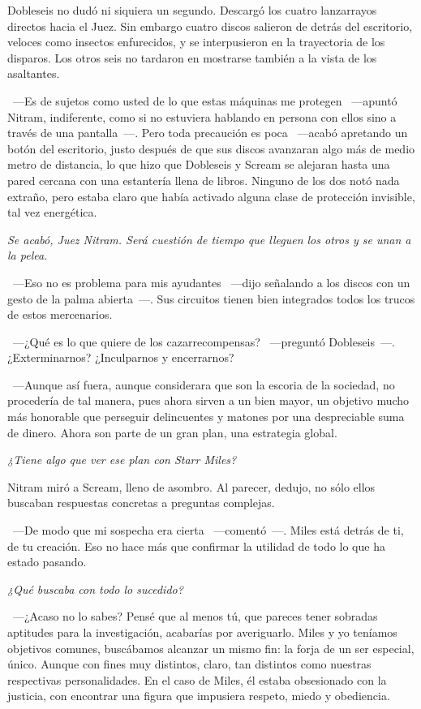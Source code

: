 Dobleseis no dudó ni siquiera un segundo. Descargó los cuatro lanzarrayos directos hacia el Juez. Sin embargo cuatro discos salieron de detrás del escritorio, veloces como insectos enfurecidos, y se interpusieron en la trayectoria de los disparos. Los otros seis no tardaron en mostrarse también a la vista de los asaltantes.

~---Es de sujetos como usted de lo que estas máquinas me protegen ~---apuntó Nitram, indiferente, como si no estuviera hablando en persona con ellos sino a través de una pantalla~---. Pero toda precaución es poca ~---acabó apretando un botón del escritorio, justo después de que sus discos avanzaran algo más de medio metro de distancia, lo que hizo que Dobleseis y Scream se alejaran hasta una pared cercana con una estantería llena de libros. Ninguno de los dos notó nada extraño, pero estaba claro que había activado alguna clase de protección invisible, tal vez energética.

\emph{Se acabó, Juez Nitram. Será cuestión de tiempo que lleguen los otros y se unan a la pelea.}

~---Eso no es problema para mis ayudantes ~---dijo señalando a los discos con un gesto de la palma abierta~---. Sus circuitos tienen bien integrados todos los trucos de estos mercenarios.

~---¿Qué es lo que quiere de los cazarrecompensas? ~---preguntó Dobleseis~---. ¿Exterminarnos? ¿Inculparnos y encerrarnos?

~---Aunque así fuera, aunque considerara que son la escoria de la sociedad, no procedería de tal manera, pues ahora sirven a un bien mayor, un objetivo mucho más honorable que perseguir delincuentes y matones por una despreciable suma de dinero. Ahora son parte de un gran plan, una estrategia global.

\emph{¿Tiene algo que ver ese plan con Starr Miles?}

Nitram miró a Scream, lleno de asombro. Al parecer, dedujo, no sólo ellos buscaban respuestas concretas a preguntas complejas.

~---De modo que mi sospecha era cierta ~---comentó~---. Miles está detrás de ti, de tu creación. Eso no hace más que confirmar la utilidad de todo lo que ha estado pasando.

\emph{¿Qué buscaba con todo lo sucedido?}

~---¿Acaso no lo sabes? Pensé que al menos tú, que pareces tener sobradas aptitudes para la investigación, acabarías por averiguarlo. Miles y yo teníamos objetivos comunes, buscábamos alcanzar un mismo fin: la forja de un ser especial, único. Aunque con fines muy distintos, claro, tan distintos como nuestras respectivas personalidades. En el caso de Miles, él estaba obsesionado con la justicia, con encontrar una figura que impusiera respeto, miedo y obediencia.


